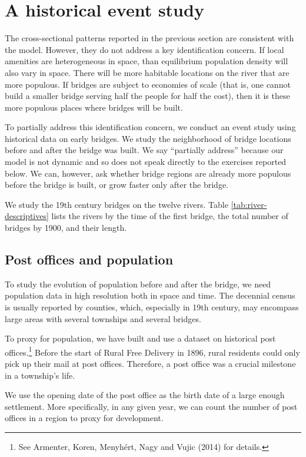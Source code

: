 \section{A historical event study}
The cross-sectional patterns reported in the previous section are consistent with the model. However, they do not address a key identification concern. If local amenities are heterogeneous in space, than equilibrium population density will also vary in space. There will be more habitable locations on the river that are more populous. If bridges are subject to economies of scale (that is, one cannot build a smaller bridge serving half the people for half the cost), then it is these more populous places where bridges will be built.

To partially address this identification concern, we conduct an event study using historical data on early bridges. We study the neighborhood of bridge locations before and after the bridge was built. We say ``partially address'' because our model is not dynamic and so does not speak directly to the exercises reported below. We can, however, ask whether bridge regions are already more populous before the bridge is built, or grow faster only after the bridge.

We study the 19th century bridges on the twelve rivers. Table \ref{tab:river-descriptives} lists the rivers by the time of the first bridge, the total number of bridges by 1900, and their length.


\subsection{Post offices and population}
To study the evolution of population before and after the bridge, we need population data in high resolution both in space and time. The decennial census is usually reported by counties, which, especially in 19th century, may encompass large areas with several townships and several bridges.

To proxy for population, we have built and use a dataset on historical post offices.\footnote{See Armenter, Koren, Menyhért, Nagy and Vujic (2014) for details.} Before the start of Rural Free Delivery in 1896, rural residents could only pick up their mail at post offices. Therefore, a post office was a crucial milestone in a township's life. 

We use the opening date of the post office as the birth date of a large enough settlement. More specifically, in any given year, we can count the number of post offices in a region to proxy for development.

